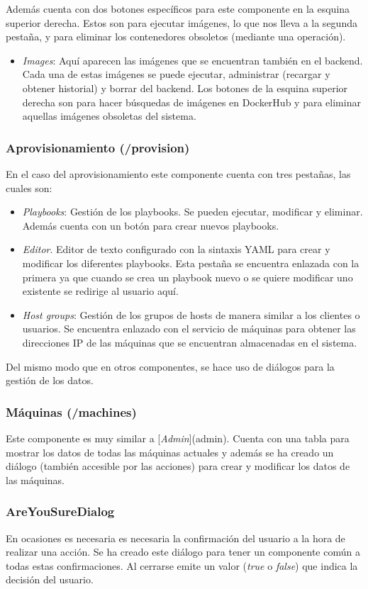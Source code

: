 \bigskip
Además cuenta con dos botones específicos para este componente en la esquina superior derecha. Estos son para ejecutar imágenes, lo que nos lleva a la segunda pestaña, y para eliminar los contenedores obsoletos (mediante una operación).
\begin{itemize}
	\item \textit{Images}: Aquí aparecen las imágenes que se encuentran también en el backend. Cada una de estas imágenes se puede ejecutar, administrar (recargar y obtener historial) y borrar del backend. Los botones de la esquina superior derecha son para hacer búsquedas de imágenes en DockerHub y para eliminar aquellas imágenes obsoletas del sistema.
\end{itemize}




\subsubsection{Aprovisionamiento (/provision)}


En el caso del aprovisionamiento este componente cuenta con tres pestañas, las cuales son:
\begin{itemize}
	\item \textit{Playbooks}: Gestión de los playbooks. Se pueden ejecutar, modificar y eliminar. Además cuenta con un botón para crear nuevos playbooks.
	\item \textit{Editor}. Editor de texto configurado con la sintaxis YAML para crear y modificar los diferentes playbooks. Esta pestaña se encuentra enlazada con la primera ya que cuando se crea un playbook nuevo o se quiere modificar uno existente se redirige al usuario aquí.
	\item \textit{Host groups}: Gestión de los grupos de hosts de manera similar a los clientes o usuarios. Se encuentra enlazado con el servicio de máquinas para obtener las direcciones IP de las máquinas que se encuentran almacenadas en el sistema.
\end{itemize}

Del mismo modo que en otros componentes, se hace uso de diálogos para la gestión de los datos.


\subsubsection{Máquinas (/machines)}


Este componente es muy similar a [\textit{Admin}](admin). Cuenta con una tabla para mostrar los datos de todas las máquinas actuales y además se ha creado un diálogo (también accesible por las acciones) para crear y modificar los datos de las máquinas.


\subsubsection{AreYouSureDialog}


En ocasiones es necesaria es necesaria la confirmación del usuario a la hora de realizar una acción. Se ha creado este  diálogo para tener un componente común a todas estas confirmaciones. Al cerrarse emite un valor (\textit{true} o \textit{false}) que indica la decisión del usuario.



